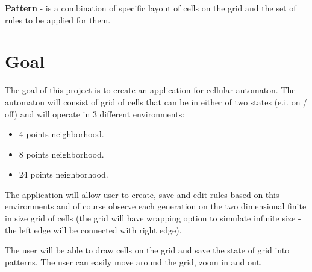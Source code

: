 \documentclass{article}
\begin{document}
\Large {\bf Pattern
} - is a combination of specific layout of cells on the grid and the set of rules to be applied for them.

\newpage

\section{Goal}

\hspace{15pt}The goal of this project is to create an application for cellular automaton. The automaton will consist of grid of cells that can be in either of two states
(e.i. on / off) and will operate in 3 different environments:
\begin{itemize}
	\item 4 points neighborhood.
	\item 8 points neighborhood.
	\item 24 points neighborhood.
\end{itemize}

\par The application will allow user to create, save and edit rules based on this environments and of course observe each generation on the two dimensional finite in size grid of cells
(the grid will have wrapping option to simulate infinite size - the left edge will be connected with right edge).

\par The user will be able to draw cells on the grid and save the state of grid into patterns.
The user can easily move around the grid, zoom in and out.

\newpage
\end{document}

